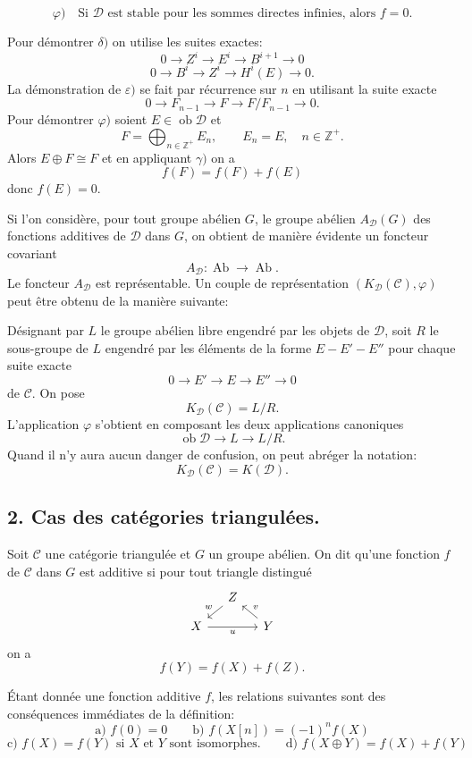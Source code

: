\documentclass[11pt]{article}
\providecommand{\Ob}{\operatorname{ob}}
\providecommand{\cC}{\mathcal C}
\providecommand{\Ob}{\operatorname{ob}}
\providecommand{\Ab}{\operatorname{Ab}}
\providecommand{\cC}{\mathcal C}
\providecommand{\cD}{\mathcal D}
\providecommand{\Ab}{\operatorname{Ab}}
\providecommand{\Ob}{\operatorname{Ob}}
\providecommand{\Ob}{\operatorname{ob}}
\providecommand{\Ob}{\operatorname{Ob}}
\begin{document}
\[
\varphi)\quad
\text{Si }\cD\text{ est stable pour les sommes directes infinies, alors }f=0.
\]

Pour démontrer $\delta)$ on utilise les suites exactes:
\[
0\longrightarrow Z^i\longrightarrow E^i\longrightarrow B^{i+1}\longrightarrow 0
\]
\[
0\longrightarrow B^i\longrightarrow Z^i\longrightarrow H^i(E)\longrightarrow 0.
\]
La démonstration de $\varepsilon)$ se fait par récurrence sur $n$ en utilisant la suite exacte
\[
0\longrightarrow F_{n-1}\longrightarrow F\longrightarrow F/F_{n-1}\longrightarrow 0.
\]
Pour démontrer $\varphi)$ soient $E\in\Ob\cD$ et
\[
F=\bigoplus_{n\in\mathbb Z^+}E_n,\qquad E_n=E,\quad n\in\mathbb Z^+.
\]
Alors $E\oplus F\cong F$ et en appliquant $\gamma)$ on a
\[
f(F)=f(F)+f(E)
\]
donc $f(E)=0$.

Si l'on considère, pour tout groupe abélien $G$, le groupe abélien $A_{\cD}(G)$ des fonctions additives de $\cD$ dans $G$, on obtient de manière évidente un foncteur covariant
\[
A_{\cD}:\Ab\longrightarrow\Ab.
\]
Le foncteur $A_{\cD}$ est représentable. Un couple de représentation $(K_{\cD}(\cC),\varphi)$ peut être obtenu de la manière suivante:

Désignant par $L$ le groupe abélien libre engendré par les objets de $\cD$, soit $R$ le sous-groupe de $L$ engendré par les éléments de la forme $E-E'-E''$ pour chaque suite exacte
\[
0\longrightarrow E'\longrightarrow E\longrightarrow E''\longrightarrow 0
\]
de $\cC$. On pose
\[
K_{\cD}(\cC)=L/R.
\]
L'application $\varphi$ s'obtient en composant les deux applications canoniques
\[
\Ob\cD\longrightarrow L\longrightarrow L/R.
\]
Quand il n'y aura aucun danger de confusion, on peut abréger la notation:
\[
K_{\cD}(\cC)=K(\cD).
\]

\subsection*{2. Cas des catégories triangulées.}

Soit $\cC$ une catégorie triangulée et $G$ un groupe abélien. On dit qu'une fonction $f$ de $\cC$ dans $G$ est additive si pour tout triangle distingué
\[
\begin{tikzcd}[column sep=small,row sep=small]
& Z \arrow[dl,"w"']\\
X \arrow[rr,"u"'] && Y \arrow[ul,"v"']
\end{tikzcd}
\]
on a
\[
f(Y)=f(X)+f(Z).
\]

Étant donnée une fonction additive $f$, les relations suivantes sont des conséquences immédiates de la définition:
\[
\text{a) } f(0)=0\qquad
\text{b) } f(X[n])=(-1)^n f(X)
\]
\[
\text{c) } f(X)=f(Y)\text{ si }X\text{ et }Y\text{ sont isomorphes.}
\qquad
\text{d) } f(X\oplus Y)=f(X)+f(Y)
\]
\end{document}
